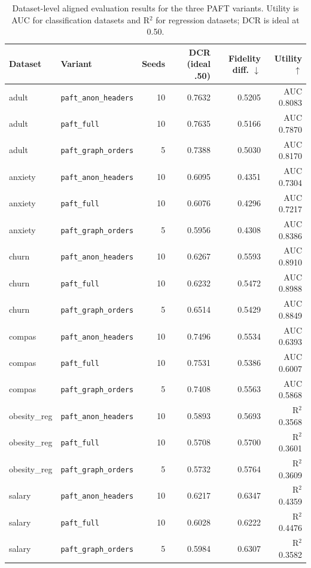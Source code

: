 \begin{table}[t]
\centering
\scriptsize
\begin{tabular}{llrrrr}
\hline
Dataset & Variant & Seeds & DCR (ideal .50) & Fidelity diff. $\downarrow$ & Utility $\uparrow$ \\
\hline
adult & \texttt{paft\_anon\_headers} & 10 & 0.7632 & 0.5205 & AUC 0.8083 \\
adult & \texttt{paft\_full} & 10 & 0.7635 & 0.5166 & AUC 0.7870 \\
adult & \texttt{paft\_graph\_orders} & 5 & 0.7388 & 0.5030 & AUC 0.8170 \\
anxiety & \texttt{paft\_anon\_headers} & 10 & 0.6095 & 0.4351 & AUC 0.7304 \\
anxiety & \texttt{paft\_full} & 10 & 0.6076 & 0.4296 & AUC 0.7217 \\
anxiety & \texttt{paft\_graph\_orders} & 5 & 0.5956 & 0.4308 & AUC 0.8386 \\
churn & \texttt{paft\_anon\_headers} & 10 & 0.6267 & 0.5593 & AUC 0.8910 \\
churn & \texttt{paft\_full} & 10 & 0.6232 & 0.5472 & AUC 0.8988 \\
churn & \texttt{paft\_graph\_orders} & 5 & 0.6514 & 0.5429 & AUC 0.8849 \\
compas & \texttt{paft\_anon\_headers} & 10 & 0.7496 & 0.5534 & AUC 0.6393 \\
compas & \texttt{paft\_full} & 10 & 0.7531 & 0.5386 & AUC 0.6007 \\
compas & \texttt{paft\_graph\_orders} & 5 & 0.7408 & 0.5563 & AUC 0.5868 \\
obesity\_reg & \texttt{paft\_anon\_headers} & 10 & 0.5893 & 0.5693 & R$^2$ 0.3568 \\
obesity\_reg & \texttt{paft\_full} & 10 & 0.5708 & 0.5700 & R$^2$ 0.3601 \\
obesity\_reg & \texttt{paft\_graph\_orders} & 5 & 0.5732 & 0.5764 & R$^2$ 0.3609 \\
salary & \texttt{paft\_anon\_headers} & 10 & 0.6217 & 0.6347 & R$^2$ 0.4359 \\
salary & \texttt{paft\_full} & 10 & 0.6028 & 0.6222 & R$^2$ 0.4476 \\
salary & \texttt{paft\_graph\_orders} & 5 & 0.5984 & 0.6307 & R$^2$ 0.3582 \\
\hline
\end{tabular}
\caption{Dataset-level aligned evaluation results for the three PAFT variants. Utility is AUC for classification datasets and R$^2$ for regression datasets; DCR is ideal at 0.50.}
\label{tab:paft_variant_dataset_level}
\end{table}
